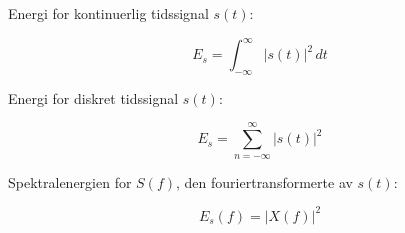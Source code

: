 Energi for kontinuerlig tidssignal $s(t)$:

\begin{equation*}
	E_s = \int_{-\infty}^{\infty} |s(t)|^2\,dt
\end{equation*}

Energi for diskret tidssignal $s(t)$:

\begin{equation*}
	E_s = \sum_{n=-\infty}^{\infty} |s(t)|^2
\end{equation*}

Spektralenergien for $S(f)$, den fouriertransformerte av $s(t)$:

\begin{equation*}
	E_s(f) = |X(f)|^2
\end{equation*}